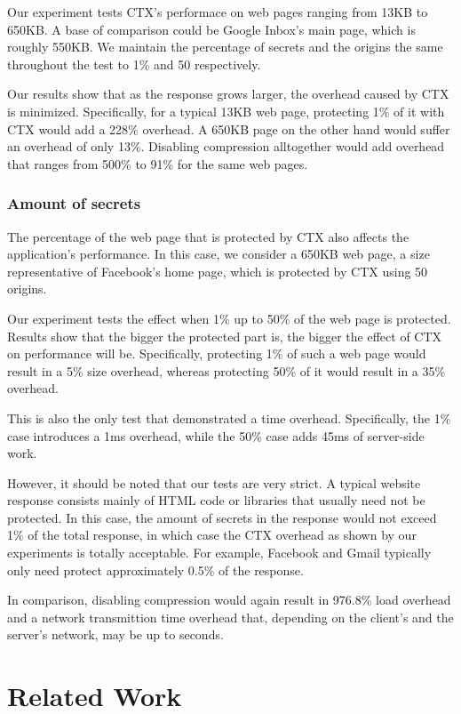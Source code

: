 \documentclass[a4paper, 11 pt, conference]{article}  %
\begin{document}
Our experiment tests CTX's performace on web pages ranging from 13KB to 650KB.
A base of comparison could be Google Inbox's main page, which is roughly 550KB.
We maintain the percentage of secrets and the origins the same throughout the
test to 1\% and 50 respectively.

Our results show that as the response grows larger, the overhead caused by CTX
is minimized. Specifically, for a typical 13KB web page, protecting 1\% of it
with CTX would add a 228\% overhead. A 650KB page on the other
hand would suffer an overhead of only 13\%. Disabling compression alltogether
would add overhead that ranges from 500\% to 91\% for the same web pages.

\subsubsection{Amount of secrets}
The percentage of the web page that is protected by CTX also affects the
application's performance. In this case, we consider a 650KB web page, a size
representative of Facebook's home page, which is protected by CTX using 50
origins.

Our experiment tests the effect when 1\% up to 50\% of the web page is
protected. Results show that the bigger the protected part is, the bigger the effect
of CTX on performance will be. Specifically, protecting 1\% of such a web page
would result in a 5\% size overhead, whereas protecting 50\% of it would result
in a 35\% overhead.

This is also the only test that demonstrated a time overhead. Specifically, the
1\% case introduces a 1ms overhead, while the 50\% case adds 45ms of server-side
work.

However, it should be noted that our tests are very strict. A typical website
response consists mainly of HTML code or libraries that usually need not be
protected. In this case, the amount of secrets in the response would not exceed
1\% of the total response, in which case the CTX overhead as shown by our
experiments is totally acceptable. For example, Facebook and Gmail typically
only need protect approximately 0.5\% of the response.

In comparison, disabling compression would again result in 976.8\% load overhead
and a network transmittion time overhead that, depending on the client's and the
server's network, may be up to seconds.

\section{Related Work}
\end{document}
